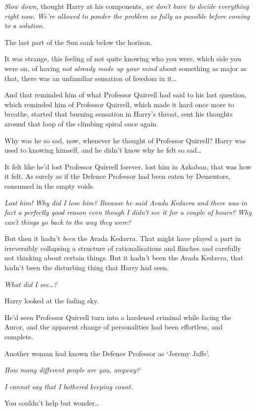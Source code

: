 \emph{Slow down,} thought Harry at his components, \emph{we don't have
to decide everything right now. We're allowed to ponder the problem as
fully as possible before coming to a solution.}

The last part of the Sun sank below the horizon.

It was strange, this feeling of not quite knowing who you were, which
side you were on, of having \emph{not already made up your mind} about
something as major as that, there was an unfamiliar sensation of freedom
in it\ldots{}

And that reminded him of what Professor Quirrell had said to his last
question, which reminded him of Professor Quirrell, which made it hard
once more to breathe, started that burning sensation in Harry's throat,
sent his thoughts around that loop of the climbing spiral once again.

Why was he so sad, now, whenever he thought of Professor Quirrell? Harry
was used to knowing himself, and he didn't know why he felt so
sad\ldots{}

It felt like he'd lost Professor Quirrell forever, lost him in Azkaban,
that was how it felt. As surely as if the Defence Professor had been
eaten by Dementors, consumed in the empty voids.

\emph{Lost him! Why did I lose him? Because he said Avada Kedavra and
there was in fact a perfectly good reason even though I didn't see it
for a couple of hours? Why can't things go back to the way they were?}

But then it hadn't \emph{been} the Avada Kedavra. That might have played
a part in irreversibly collapsing a structure of rationalisations and
flinches and carefully not thinking about certain things. But it hadn't
been the Avada Kedavra, that hadn't been the disturbing thing that Harry
had seen.

\emph{What did I see\ldots{}?}

Harry looked at the fading sky.

He'd seen Professor Quirrell turn into a hardened criminal while facing
the Auror, and the apparent change of personalities had been effortless,
and complete.

Another woman had known the Defence Professor as `Jeremy Jaffe'.

\emph{How many different people are you, anyway?}

\emph{I cannot say that I bothered keeping count.}

You couldn't help but wonder\ldots{}

